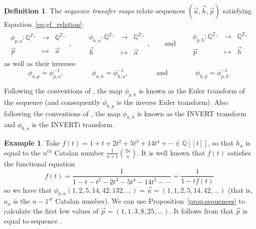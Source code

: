 \documentclass[11pt]{amsart}
\theoremstyle{definition}
\newtheorem{definition}[theorem]{Definition}
\newtheorem{example}[theorem]{Example}
\numberwithin{equation}{section}
\def\ZZ{{\mathbb Z}}
\def\QQ{{\mathbb Q}}
\begin{document}
\begin{definition}
\label{defn:sequencetransfer}
The \emph{sequence transfer maps} relate sequences $(\vec{a}, \vec{h}, \vec{p})$ satisfying Equation~\eqref{eq:gf_relation}:
\begin{align*}
\begin{array}{rcl}
\phi_{p, a} : \QQ^{\ZZ_+} & \to & \QQ^{\ZZ_+} \\
\vec{p} & \mapsto & \vec{a}
\end{array},
\qquad
\begin{array}{rcl}
\phi_{h, a} : \QQ^{\ZZ_+} & \to & \QQ^{\ZZ_+} \\
\vec{h} & \mapsto & \vec{a}
\end{array},
\qquad\text{and}\qquad 
\begin{array}{rcl}
\phi_{p, h} : \QQ^{\ZZ_+} & \to & \QQ^{\ZZ_+} \\
\vec{p} & \mapsto & \vec{h}
\end{array}
\end{align*}
as well as their inverses
\[
\phi_{a, p} = \phi_{p, a}^{-1},
\qquad\qquad
\phi_{a, h} = \phi_{h, a}^{-1},
\qquad\qquad\text{and}\qquad\qquad
\phi_{h, p} = \phi_{p, h}^{-1}.
\]
\end{definition}

Following the conventions of \cite{OEIS}, the map $\phi_{p,h}$ is known
as the Euler transform of the sequence
(and consequently $\phi_{h,p}$ is the inverse Euler transform).
Also following the conventions
of \cite{OEIS},
the map $\phi_{a,h}$ is known as the INVERT transform
and $\phi_{h,a}$ is the INVERTi transform.

\begin{example}
\label{ex:catalan}
Take $f(t) = 1 + t + 2 t^{2} + 5t^3 + 14t^4 + \cdots \in \QQ[[t]]$,
so that $h_n$ is equal to the $n^{th}$ Catalan number
$\frac{1}{n+1}\binom{2n}{n}$.  It is well known that $f(t)$ satisfies the functional equation
\[
f(t) = \frac{1}{1 - t - t^2 - 2t^3 - 5t^4 - 14t^5 - \cdots} = \frac{1}{1-t f(t)}
\]
so we have that $\phi_{h,a}(1,2,5,14,42,132,\ldots) = \vec{a} = (1,1,2,5,14,42, \ldots)$
(that is, $a_n$ is the $n-1^{st}$ Catalan number).
We can use Proposition~\ref{prop:sequences} to calculate the first few values of $\vec{p} = (1,1,3,8,25, \ldots)$.
It follows from \cite[\S 5.1.3]{NT05} that $\vec{p}$ is equal to sequence \cite[\href{https://oeis.org/A022553}{A022553}]{OEIS}.
\end{example}
\end{document}
